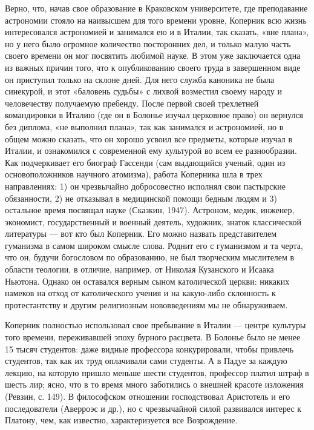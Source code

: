 Верно, что, начав свое образование в Краковском университете, где
преподавание астрономии стояло на наивысшем для того времени уровне,
Коперник всю жизнь интересовался астрономией и занимался ею и в
Италии, так сказать, «вне плана», но у него было огромное количество
посторонних дел, и только малую часть своего времени он мог посвятить
любимой науке. В этом уже заключается одна из важных причин того, что
к опубликованию своего труда в завершенном виде он приступил только на
склоне дней. Для него служба каноника не была синекурой, и этот
«баловень судьбы» с лихвой возместил своему народу и человечеству
получаемую пребенду. После первой своей трехлетней командировки в
Италию (где он в Болонье изучал церковное право) он вернулся без
диплома, «не выполнил плана», так как занимался и астрономией, но в
общем можно сказать, что он хорошо усвоил все предметы, которые изучал
в Италии, и ознакомился с современной ему культурой во всем ее
разнообразии. Как подчеркивает его биограф Гассенди (сам выдающийся
ученый, один из основоположников научного атомизма), работа Коперника
шла в трех направлениях: 1) он чрезвычайно добросовестно исполнял свои
пастырские обязанности, 2) не отказывал в медицинской помощи бедным
людям и 3) остальное время посвящал науке (Сказкин, 1947). Астроном,
медик, инженер, экономист, государственный и военный деятель,
художник, знаток классической литературы --- вот кто был Коперник. Его
можно назвать представителем гуманизма в самом широком смысле слова.
Роднит его с гуманизмом и та черта, что он, будучи богословом по
образованию, не был творческим мыслителем в области теологии, в
отличие, например, от Николая Кузанского и Исаака Ньютона. Однако он
оставался верным сыном католической церкви: никаких намеков на отход
от католического учения и на какую-либо склонность к протестантству и
другим религиозным нововведениям мы не обнаруживаем.

Коперник полностью использовал свое пребывание в Италии --- центре
культуры того времени, переживавшей эпоху бурного расцвета. В Болонье
было не менее 15 тысяч студентов: даже видные профессора
конкурировали, чтобы привлечь студентов, так как их труд оплачивали
сами студенты. А в Падуе за каждую лекцию, на которую пришло меньше
шести студентов, профессор платил штраф в шесть лир; ясно, что в то
время много заботились о внешней красоте изложения (Ревзин, с. 149). В
философском отношении господствовал Аристотель и его последователи
(Аверроэс и др.), но с чрезвычайной силой развивался интерес к
Платону, чем, как известно, характеризуется все Возрождение.

